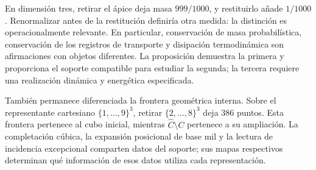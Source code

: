 En dimensión tres, retirar el ápice deja masa \(999/1000\), y
restituirlo añade \(1/1000\). Renormalizar antes de la restitución
definiría otra medida: la distinción es operacionalmente relevante.
En particular, conservación de masa probabilística, conservación de los
registros de transporte y disipación termodinámica son afirmaciones con
objetos diferentes. La proposición demuestra la primera y proporciona el
soporte compatible para estudiar la segunda; la tercera requiere una
realización dinámica y energética especificada.

También permanece diferenciada la frontera geométrica interna.
Sobre el representante cartesiano \(\{1,\ldots,9\}^3\), retirar
\(\{2,\ldots,8\}^3\) deja \(386\) puntos. Esta frontera pertenece al
cubo inicial, mientras \(\widehat C\setminus C\) pertenece a su
ampliación. La completación cúbica, la expansión posicional de base mil y
la lectura de incidencia excepcional comparten datos del soporte;
sus mapas respectivos determinan qué información de esos datos utiliza
cada representación.

